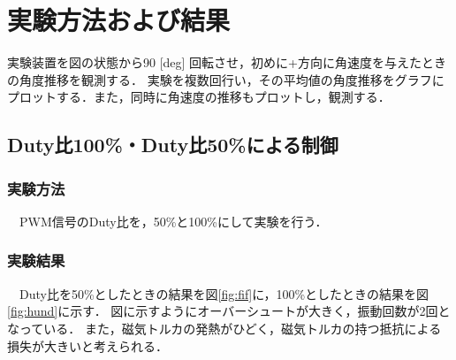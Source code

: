 \section{実験方法および結果}
実験装置を図の状態から90 [deg] 回転させ，初めに+方向に角速度を与えたときの角度推移を観測する．
実験を複数回行い，その平均値の角度推移をグラフにプロットする．また，同時に角速度の推移もプロットし，観測する．
\subsection{Duty比100\%・Duty比50\%による制御}
\subsubsection{実験方法}
　PWM信号のDuty比を，50\%と100\%にして実験を行う．


\subsubsection{実験結果}
　Duty比を50\%としたときの結果を図\ref{fig:fif}に，100\%としたときの結果を図\ref{fig:hund}に示す．
図に示すようにオーバーシュートが大きく，振動回数が2回となっている．
また，磁気トルカの発熱がひどく，磁気トルカの持つ抵抗による損失が大きいと考えられる．

